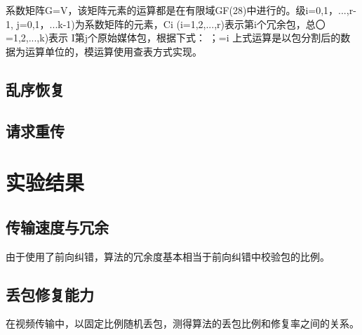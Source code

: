 \documentclass[onecolumn]{article}
\begin{document}
\begin{CJK*}{UTF8}{gbsn}
系数矩阵G=V，该矩阵元素的运算都是在有限域GF(28)中进行的。级i=0,1，...,r-1, j=0,1，...k-1)为系数矩阵的元素，Ci (i=1,2,...,r)表示第i个冗余包，总〇=1,2,...,k)表示
I第j个原始媒体包，根据下式：
；=i
上式运算是以包分割后的数据为运算单位的，模运算使用查表方式实现。

\subsection{乱序恢复}

\subsection{请求重传}




\section{实验结果}
\subsection{传输速度与冗余}
由于使用了前向纠错，算法的冗余度基本相当于前向纠错中校验包的比例。
\subsection{丢包修复能力}
在视频传输中，以固定比例随机丢包，测得算法的丢包比例和修复率之间的关系。

\end{CJK*}
\end{document}
